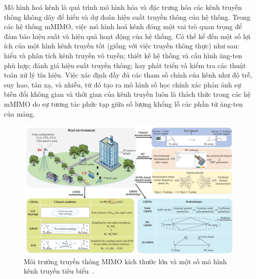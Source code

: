 Mô hình hoá kênh là quá trình mô hình hóa và đặc trưng hóa các kênh truyền thông không dây để hiểu và dự đoán hiệu suất truyền thông của hệ thống. Trong các hệ thống mMIMO, việc mô hình hoá kênh đóng một vai trò quan trọng để đảm bảo hiệu suất và hiệu quả hoạt động của hệ thống. Có thể kể đến một số lợi ích của một hình kênh truyền tốt (giống với việc truyền thông thực) như sau: hiểu và phân tích kênh truyền vô tuyến; thiết kế hệ thống và cấu hình ăng-ten phù hợp; đánh giá hiệu suất truyền thông; hay phát triển và kiểm tra các thuật toán xử lý tín hiệu. Việc xác định đầy đủ các tham số chính của kênh như độ trễ, suy hao, tán xạ, và nhiễu, từ đó tạo ra mô hình số học chính xác phản ánh sự biến đổi không gian và thời gian của kênh truyền luôn là thách thức trong các hệ mMIMO do sự tương tác phức tạp giữa số lượng khổng lồ các phần tử ăng-ten của mảng. 
\begin{figure}[htb]
    \centering
    \includegraphics[width=\linewidth]{figures/Fig5.pdf}
    \caption{Môi trường truyền thông MIMO kích thước lớn và một số mô hình kênh truyền tiêu biểu~\cite{Feng2022}.}
    \label{fig:channel_model}
\end{figure}

